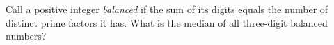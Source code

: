 Call a positive integer \emph{balanced} if the sum of its digits equals the number of distinct prime factors it has. What is the median of all three-digit balanced numbers?
